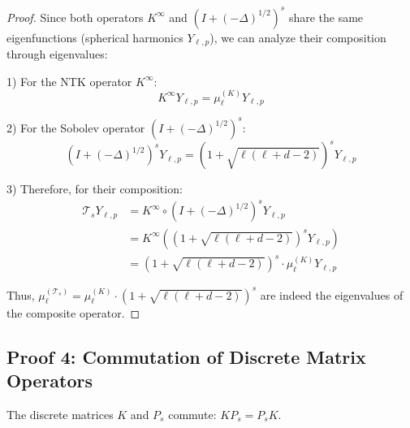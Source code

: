 \documentclass[a4paper]{article}
\begin{document}
\begin{proof}
Since both operators $K^{\infty}$ and $(I + (-\Delta)^{1/2})^s$ share the same eigenfunctions (spherical harmonics $Y_{\ell,p}$), we can analyze their composition through eigenvalues:

1) For the NTK operator $K^{\infty}$:
   \[ K^{\infty} Y_{\ell,p} = \mu_\ell^{(K)} Y_{\ell,p} \]

2) For the Sobolev operator $(I + (-\Delta)^{1/2})^s$:
   \[ (I + (-\Delta)^{1/2})^s Y_{\ell,p} = (1 + \sqrt{\ell(\ell + d - 2)})^s Y_{\ell,p} \]

3) Therefore, for their composition:
   \begin{align*}
   \mathcal{T}_s Y_{\ell,p} &= K^{\infty} \circ (I + (-\Delta)^{1/2})^s Y_{\ell,p} \\
   &= K^{\infty}((1 + \sqrt{\ell(\ell + d - 2)})^s Y_{\ell,p}) \\
   &= (1 + \sqrt{\ell(\ell + d - 2)})^s \cdot \mu_\ell^{(K)} Y_{\ell,p}
   \end{align*}

Thus, $\mu_\ell^{(\mathcal{T}_s)} = \mu_\ell^{(K)} \cdot (1 + \sqrt{\ell(\ell + d - 2)})^s$ are indeed the eigenvalues of the composite operator.
\end{proof}






\subsection{Proof 4: Commutation of Discrete Matrix Operators}

\begin{theorem}
The discrete matrices $K$ and $P_s$ commute: $KP_s = P_sK$.
\end{theorem}
\end{document}
